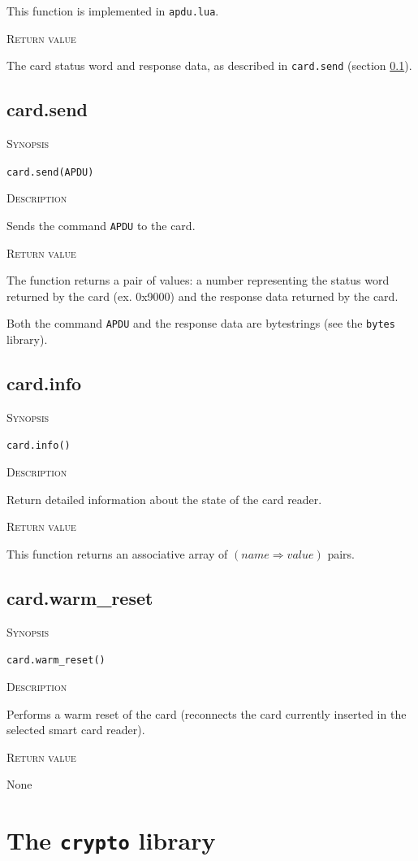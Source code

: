 \documentclass[11pt]{report}
\newcommand{\mansection}[1]{\vspace{0.5em}\par\noindent\textsc{#1}\vspace{0.5em}\par}
\newcommand{\syn}[1]{\texttt{#1}}
\begin{document}
  This function is implemented in \syn{apdu.lua}.

\mansection{Return value}
  The card status word and response data, as described in \syn{card.send} (section \ref{sec:card_send}).


\subsection{card.send}
\label{sec:card_send}

\mansection{Synopsis}
\syn{card.send(APDU)}

\mansection{Description}
  Sends the command \syn{APDU} to the card. 

\mansection{Return value}
  The function returns a pair of values: a number representing the status word 
  returned by the card (ex. 0x9000) and the response data returned by the card.
  
  Both the command \syn{APDU} and the response data are bytestrings 
  (see the \syn{bytes} library).


\subsection{card.info}

\mansection{Synopsis}
\syn{card.info()}

\mansection{Description}
  Return detailed information about the state of the card reader.

\mansection{Return value}
  This function returns an associative array of $(name \Rightarrow value)$ pairs.


\subsection{card.warm\_reset}

\mansection{Synopsis}
\syn{card.warm\_reset()}

\mansection{Description}
  Performs a warm reset of the card 
  (reconnects the card currently inserted in the selected smart card reader).

\mansection{Return value}
  None

\section{The \syn{crypto} library}
\end{document}
